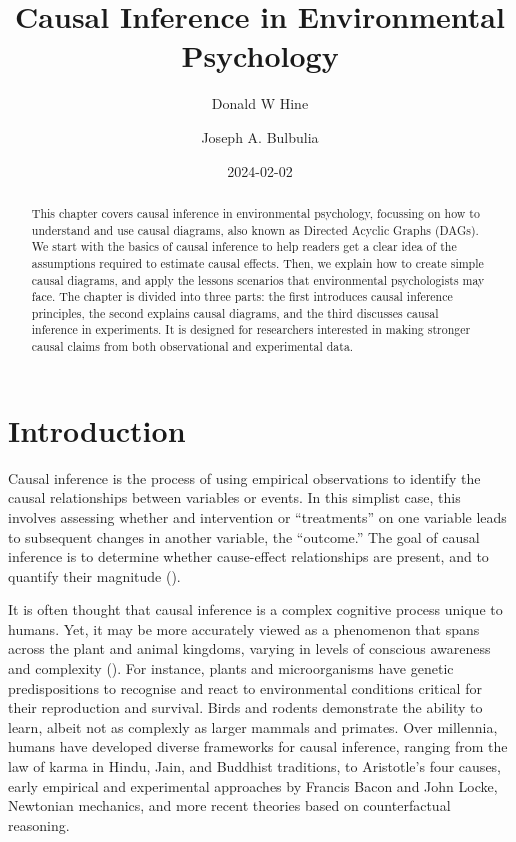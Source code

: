 \documentclass[
  singlecolumn]{article}
\title{Causal Inference in Environmental Psychology}
\author{Donald W Hine \and Joseph A. Bulbulia}
\date{2024-02-02}
\begin{document}
\maketitle
\begin{abstract}
This chapter covers causal inference in environmental psychology,
focussing on how to understand and use causal diagrams, also known as
Directed Acyclic Graphs (DAGs). We start with the basics of causal
inference to help readers get a clear idea of the assumptions required
to estimate causal effects. Then, we explain how to create simple causal
diagrams, and apply the lessons scenarios that environmental
psychologists may face. The chapter is divided into three parts: the
first introduces causal inference principles, the second explains causal
diagrams, and the third discusses causal inference in experiments. It is
designed for researchers interested in making stronger causal claims
from both observational and experimental data.
\end{abstract}

\section{Introduction}\label{introduction}

Causal inference is the process of using empirical observations to
identify the causal relationships between variables or events. In this
simplist case, this involves assessing whether and intervention or
``treatments'' on one variable leads to subsequent changes in another
variable, the ``outcome.'' The goal of causal inference is to determine
whether cause-effect relationships are present, and to quantify their
magnitude ().

It is often thought that causal inference is a complex cognitive process
unique to humans. Yet, it may be more accurately viewed as a phenomenon
that spans across the plant and animal kingdoms, varying in levels of
conscious awareness and complexity
(). For instance,
plants and microorganisms have genetic predispositions to recognise and
react to environmental conditions critical for their reproduction and
survival. Birds and rodents demonstrate the ability to learn, albeit not
as complexly as larger mammals and primates. Over millennia, humans have
developed diverse frameworks for causal inference, ranging from the law
of karma in Hindu, Jain, and Buddhist traditions, to Aristotle's four
causes, early empirical and experimental approaches by Francis Bacon and
John Locke, Newtonian mechanics, and more recent theories based on
counterfactual reasoning.
\end{document}
